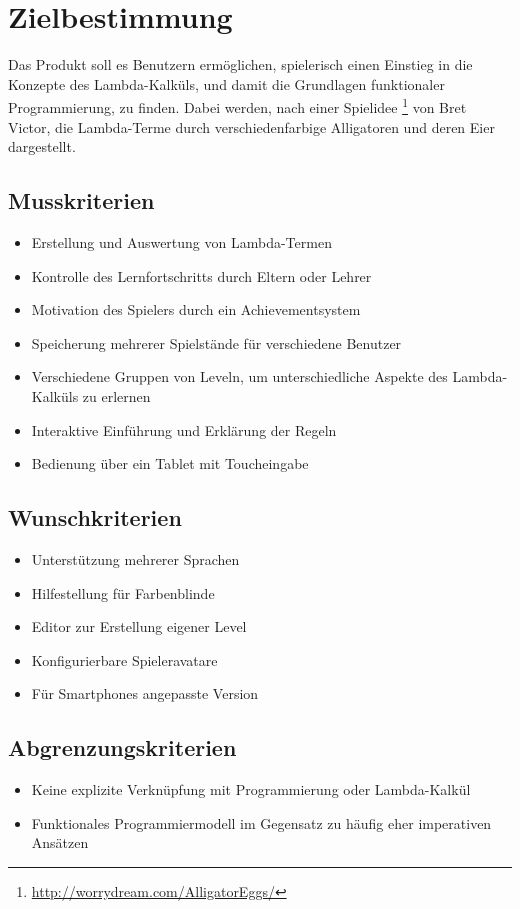\section{Zielbestimmung}
Das Produkt soll es Benutzern ermöglichen, spielerisch einen Einstieg in die Konzepte des Lambda-Kalküls, und damit die Grundlagen funktionaler Programmierung, zu finden.
Dabei werden, nach einer Spielidee \footnote{\url{http://worrydream.com/AlligatorEggs/}} von Bret Victor, die Lambda-Terme durch verschiedenfarbige Alligatoren und deren Eier dargestellt.


\subsection{Musskriterien}

\begin{itemize}
	\item Erstellung und Auswertung von Lambda-Termen
	\item Kontrolle des Lernfortschritts durch Eltern oder Lehrer
	\item Motivation des Spielers durch ein Achievementsystem
	\item Speicherung mehrerer Spielstände für verschiedene Benutzer
	\item Verschiedene Gruppen von Leveln, um unterschiedliche Aspekte des Lambda-Kalküls zu erlernen
	\item Interaktive Einführung und Erklärung der Regeln
	\item Bedienung über ein Tablet mit Toucheingabe
\end{itemize}


\subsection{Wunschkriterien}

\begin{itemize}
	\item Unterstützung mehrerer Sprachen
	\item Hilfestellung für Farbenblinde
	\item Editor zur Erstellung eigener Level
	\item Konfigurierbare Spieleravatare
	\item Für Smartphones angepasste Version
\end{itemize}


\subsection{Abgrenzungskriterien}

\begin{itemize}
	\item Keine explizite Verknüpfung mit Programmierung oder Lambda-Kalkül
	\item Funktionales Programmiermodell im Gegensatz zu häufig eher imperativen Ansätzen
\end{itemize}
